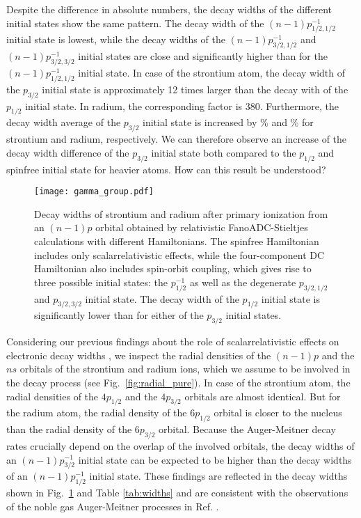 Despite the difference in absolute numbers, the decay widths
of the different initial states show the same pattern. The decay width of
the $(n-1)p_{1/2,1/2}^{-1}$ initial state is lowest, while the decay widths
of the $(n-1)p_{3/2,1/2}^{-1}$ and
$(n-1)p_{3/2,3/2}^{-1}$ initial states are close and significantly higher than
for the $(n-1)p_{1/2,1/2}^{-1}$ initial state.
In case of the strontium atom, the decay width of the $p_{3/2}$ initial state
is approximately 12 times larger than the decay with of the $p_{1/2}$ initial state.
In radium, the corresponding factor is 380.
Furthermore, the decay width average of the $p_{3/2}$ initial state is increased 
by \unit[114]{\%} and \unit[236]{\%} for strontium and radium, respectively.
We can therefore observe an increase
of the decay width difference of the $p_{3/2}$ initial state both
compared to the $p_{1/2}$ and spinfree initial state for heavier atoms.
How can this result be understood?

\begin{figure}[h]
 \centering
 \texttt{[image: gamma\_group.pdf]}
 \caption{Decay widths of strontium and radium after primary ionization from
          an $(n-1)p$ orbital obtained by relativistic FanoADC-Stieltjes
          calculations with different Hamiltonians. The spinfree Hamiltonian
          includes only scalarrelativistic effects, while the four-component
          DC Hamiltonian also includes spin-orbit coupling, which gives rise to
          three possible initial states: the $p_{1/2}^{-1}$ as well as the
          degenerate $p_{3/2,1/2}$ and $p_{3/2,3/2}$ initial state.
          The decay width of the $p_{1/2}$
          initial state is significantly lower than for either of the
          $p_{3/2}$ initial
          states.}
 \label{fig:gamma}
\end{figure}

Considering our previous findings about the role
of scalarrelativistic effects on electronic decay widths \cite{Fasshauer15_1},
we inspect the radial densities of the $(n-1)p$ and the $ns$ orbitals of the
strontium and radium ions,
which we assume to be involved in the decay process (see
Fig.~\ref{fig:radial_pure}).
In case of the strontium atom, the radial densities of the $4p_{1/2}$ and the
$4p_{3/2}$ orbitals are almost identical. But for the radium atom, the radial
density of the  $6p_{1/2}$ orbital is closer to the nucleus than
the radial density of the $6p_{3/2}$ orbital.
Because the Auger-Meitner decay rates crucially depend on the overlap of the
involved orbitals, the decay widths of an $(n-1)p_{3/2}^{-1}$ initial state
can be expected to be higher than the decay widths of an $(n-1)p_{1/2}^{-1}$
initial state. These findings are reflected in the decay widths shown in
Fig.~\ref{fig:gamma} and Table \ref{tab:widths} and are consistent with the
observations of the noble gas Auger-Meitner processes in Ref. \cite{Fasshauer15_1}.


